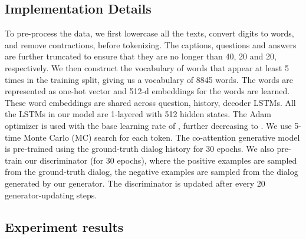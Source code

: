 \documentclass[10pt,twocolumn,letterpaper]{article}
\begin{document}

\subsection{Implementation Details}
To pre-process the data, we first lowercase all the texts, convert digits to words, and remove contractions, before tokenizing. The captions, questions and answers are further truncated to ensure that they are no longer than 40, 20 and 20, respectively. We then construct the vocabulary of words that appear at least 5 times in the training split, giving us a vocabulary of 8845 words. The words are represented as one-hot vector and 512-d embeddings for the words are learned. These word embeddings are shared across question, history, decoder LSTMs. All the LSTMs in our model are 1-layered with 512 hidden states. The Adam \cite{kingma2014adam} optimizer is used with the base learning rate of , further decreasing to . We use 5-time Monte Carlo (MC) search for each token. The co-attention generative model is pre-trained using the ground-truth dialog history for 30 epochs. We also pre-train our discriminator (for 30 epochs), where the positive examples are sampled from the ground-truth dialog, the negative examples are sampled from the dialog generated by our generator. The discriminator is updated after every 20 generator-updating steps.

\subsection{Experiment results}
\end{document}
